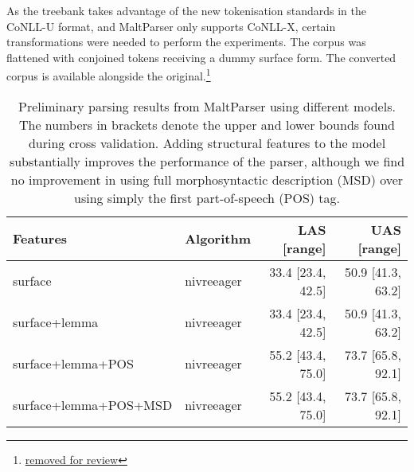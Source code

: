 \documentclass[a4paper,11pt, onecolumn,twoside]{article}
\begin{document}
As the treebank takes advantage of the new tokenisation standards in the CoNLL-U format,
and MaltParser only supports CoNLL-X, certain transformations were needed to perform 
the experiments. The corpus was flattened with conjoined tokens receiving a dummy 
surface form. The converted corpus is available alongside the original.\footnote{\url{removed for review}}






\begin{table}[htbp]
	\caption{Preliminary parsing results from MaltParser using different models. The numbers in brackets denote the upper and lower bounds found during cross validation. Adding structural features to the model substantially improves the performance of the parser, although we find no improvement in using full morphosyntactic description (MSD) over using simply the first part-of-speech (POS) tag.}
	\centering
	\begin{tabular}{llrr}
		\toprule
			\textbf{Features}       & \textbf{Algorithm} &\textbf{LAS} [range] & \textbf{UAS} [range] \\
		\midrule
			surface                & nivreeager  & 33.4 [23.4, 42.5] & 50.9 [41.3, 63.2] \\
			surface+lemma          & nivreeager  & 33.4 [23.4, 42.5] & 50.9 [41.3, 63.2] \\
			surface+lemma+POS      & nivreeager  & 55.2 [43.4, 75.0] & 73.7 [65.8, 92.1] \\
			surface+lemma+POS+MSD  & nivreeager  & 55.2 [43.4, 75.0] & 73.7 [65.8, 92.1] \\
		\bottomrule
	\end{tabular}
	\label{table:eval}
\end{table}
\end{document}
